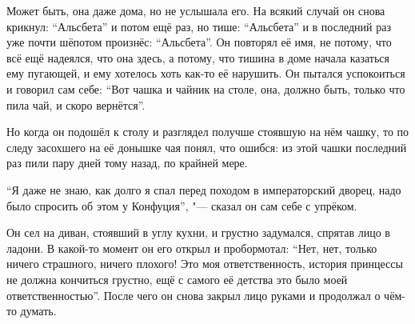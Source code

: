Может быть, она даже дома, но не услышала его.
На всякий случай он снова крикнул: \enquote{Альсбета} и потом ещё раз, но тише:
\enquote{Альсбета} и в последний раз уже почти шёпотом произнёс:
\enquote{Альсбета}.
Он повторял её имя, не потому, что всё ещё надеялся, что она здесь, а потому,
что тишина в доме начала казаться ему пугающей, и ему хотелось хоть как-то её
нарушить.
Он пытался успокоиться и говорил сам себе:
\enquote{Вот чашка и чайник на столе, она, должно быть, только что пила чай, и
скоро вернётся}.

Но когда он подошёл к столу и разглядел получше стоявшую на нём чашку, то по
следу засохшего на её донышке чая понял, что ошибся: из этой чашки последний раз
пили пару дней тому назад, по крайней мере.

\enquote{Я даже не знаю, как долго я спал перед походом в императорский дворец,
надо было спросить об этом у Конфуция}, "--- сказал он сам себе с упрёком.

Он сел на диван, стоявший в углу кухни, и грустно задумался, спрятав лицо в
ладони.
В какой-то момент он его открыл и пробормотал:
\enquote{Нет, нет, только ничего страшного, ничего плохого!
Это моя ответственность, история принцессы не должна кончиться грустно, ещё с
самого её детства это было моей ответственностью}.
После чего он снова закрыл лицо руками и продолжал о чём-то думать.
